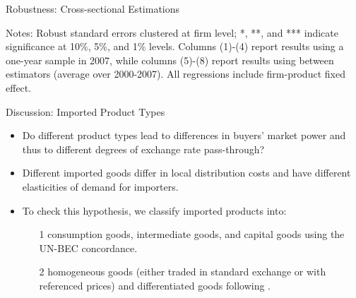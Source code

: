 \documentclass[10pt]{beamer}
\begin{document}
\begin{frame}{Robustness: Cross-sectional Estimations}
\begin{table}[htbp]
{\begin{threeparttable}
\begin{tablenotes}
			\footnotesize
			\item Notes: Robust standard errors clustered at firm level; *, **, and *** indicate significance at 10\%, 5\%, and 1\% levels. Columns (1)-(4) report results using a one-year sample in 2007, while columns (5)-(8) report results using between estimators (average over 2000-2007). All regressions include firm-product fixed effect.
		\end{tablenotes}
	\end{threeparttable}
        }
	\label{tab.robust.crosec}
    \end{table}
    \hyperlink{robustness_other}{}
\end{frame}

\begin{frame}{Discussion: Imported Product Types}
    \begin{itemize}
	\item Do different product types lead to differences in buyers' market power and thus to different degrees of exchange rate pass-through?
        \item Different imported goods differ in local distribution costs and have different elasticities of demand for importers.
        \item To check this hypothesis, we classify imported products into:
        \begin{itemize}
            \item [1] consumption goods, intermediate goods, and capital goods using the UN-BEC concordance.
            \item [2] homogeneous goods (either traded in standard exchange or with referenced prices) and differentiated goods following \cite{rauch1999networks}.
        \end{itemize}
    \end{itemize}
\end{frame}
\end{document}
